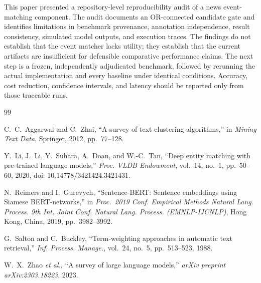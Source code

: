 \documentclass[sigconf,natbib=true,anonymous=true]{acmart}
\begin{document}
This paper presented a repository-level reproducibility audit of a news event-matching component. The audit documents an OR-connected candidate gate and identifies limitations in benchmark provenance, annotation independence, result consistency, simulated model outputs, and execution traces. The findings do not establish that the event matcher lacks utility; they establish that the current artifacts are insufficient for defensible comparative performance claims. The next step is a frozen, independently adjudicated benchmark, followed by rerunning the actual implementation and every baseline under identical conditions. Accuracy, cost reduction, confidence intervals, and latency should be reported only from those traceable runs.

\begin{thebibliography}{99}
\footnotesize
\setlength{\itemsep}{1pt}
\setlength{\parskip}{0pt}

C.~C.~Aggarwal and C.~Zhai, ``A survey of text clustering algorithms,'' in \textit{Mining Text Data}, Springer, 2012, pp.\ 77--128.

Y.~Li, J.~Li, Y.~Suhara, A.~Doan, and W.-C.~Tan, ``Deep entity matching with pre-trained language models,'' \textit{Proc. VLDB Endowment}, vol.~14, no.~1, pp.~50--60, 2020, doi: 10.14778/3421424.3421431.

N.~Reimers and I.~Gurevych, ``Sentence-BERT: Sentence embeddings using Siamese BERT-networks,'' in \textit{Proc.\ 2019 Conf. Empirical Methods Natural Lang. Process. 9th Int. Joint Conf. Natural Lang. Process. (EMNLP-IJCNLP)}, Hong Kong, China, 2019, pp.\ 3982--3992.

G.~Salton and C.~Buckley, ``Term-weighting approaches in automatic text retrieval,'' \textit{Inf. Process. Manage.}, vol.~24, no.~5, pp.\ 513--523, 1988.

W.~X.~Zhao \textit{et al.}, ``A survey of large language models,'' \textit{arXiv preprint arXiv:2303.18223}, 2023.

\end{thebibliography}
\end{document}
